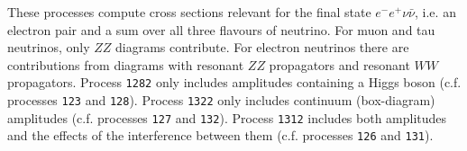 
These processes compute cross sections relevant for the final state
$e^- e^+ \nu \bar \nu$, i.e. an electron pair and a sum over all three
flavours of neutrino.  For muon and tau neutrinos, only $ZZ$ diagrams
contribute.  For electron neutrinos there are contributions from
diagrams with resonant $ZZ$ propagators and resonant $WW$ propagators.
Process {\tt 1282} only includes amplitudes containing a Higgs boson
(c.f. processes {\tt 123} and {\tt 128}). Process {\tt 1322} only
includes continuum (box-diagram) amplitudes (c.f. processes {\tt 127}
and {\tt 132}).  Process {\tt 1312} includes both amplitudes and the
effects of the interference between them (c.f. processes {\tt 126} and
{\tt 131}).

% 
